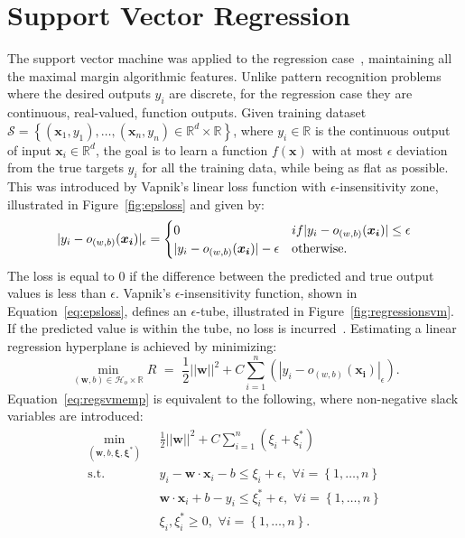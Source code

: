 \documentclass[reqno]{vcuthesis}
\newcommand{\set}[1]{{\left\{#1\right\}}}
\newcommand{\reals}{{\mathbb{R}}}
\numberwithin{equation}{chapter}
\begin{document}
\section{Support Vector Regression}
The support vector machine was applied to the regression case~\cite{Drucker1997,vapnik1997support}, maintaining all the maximal margin algorithmic features. Unlike pattern recognition problems where the desired outputs $y_i$ are discrete, for the regression case they are continuous, real-valued, function outputs. Given training dataset $\mathcal{S} = \set{(\bm x_1,y_1), \ldots, (\bm x_n,y_n) \in \reals^d \times \reals}$, where $y_i \in \reals$ is the continuous output of input $\bm x_i \in \reals^d$, the goal is to learn a function $f(\bm x)$ with at most $\epsilon$ deviation from the true targets $y_i$ for all the training data, while being as flat as possible. This was introduced by Vapnik's linear loss function with $\epsilon$-insensitivity zone, illustrated in Figure~\ref{fig:epsloss} and given by:
\begin{equation}
\label{eq:epsloss}
\centering
|y_i - o_{(w,b)}(\bm{x_i})|_\epsilon = \begin{cases} 
															0 & if |y_i - o_{(w,b)}(\bm{x_i})| \leq \epsilon \\
															|y_i - o_{(w,b)}(\bm{x_i})| - \epsilon & \text{otherwise}.
														\end{cases}
\end{equation}
The loss is equal to 0 if the difference between the predicted and true output values is less than $\epsilon$. Vapnik's $\epsilon$-insensitivity function, shown in Equation~\ref{eq:epsloss}, defines an $\epsilon$-tube, illustrated in Figure~\ref{fig:regressionsvm}. If the predicted value is within the tube, no loss is incurred~\cite{Kecman2001}. Estimating a linear regression hyperplane is achieved by minimizing:
\begin{equation}
\label{eq:regsvmemp}
\min\limits_{(\bm{w},b) \in \mathcal{H}_o \times \reals} R {\,\,} = {\,\,} \frac{1}{2}||\bm{w}||^2 + C\sum_{i=1}^n (|y_i - o_{(w,b)}(\bm{x_i})|_\epsilon).
\end{equation}
Equation~\ref{eq:regsvmemp} is equivalent to the following, where non-negative slack variables are introduced:
\begin{equation}
\label{eq:softsvropt}
\begin{aligned}
\min\limits_{(\bm{w},b,\bm \xi,\bm \xi^*)} & {\,\,\,\,} \frac{1}{2}||\bm{w}||^2 + C\sum_{i=1}^n{\left(\xi_i + \xi^*_i \right)} \\
\text{s.t.} & {\,\,\,\,} y_i - \bm{w} \cdot \bm{x}_i  - b \leq \xi_i + \epsilon, {\,\,} \forall i = \set{1,\ldots,n}\\
				 & {\,\,\,\,} \bm{w} \cdot \bm{x}_i + b - y_i \leq \xi_i^* + \epsilon, {\,\,} \forall i = \set{1,\ldots,n} \\
				 & {\,\,\,\,} \xi_i, \xi^*_i \geq 0, {\,\,} \forall i = \set{1,\ldots,n}.
\end{aligned}
\end{equation}
\end{document}
